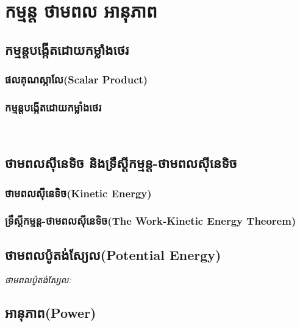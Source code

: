 \chapter{កម្មន្ត ថាមពល អានុភាព}
\section{កម្មន្តបង្កើតដោយកម្លាំងថេរ}
\subsection{ផលគុណស្កាលែ{\en(Scalar Product)}}
\subsection{កម្មន្តបង្កើតដោយកម្លាំងថេរ}​
\section{ថាមពលស៊ីនេទិច និងទ្រឹស្តីកម្មន្ត-ថាមពលស៊ីនេទិច}
\subsection{ថាមពលស៊ីនេទិច{\en(Kinetic Energy)}}
\subsection{ទ្រឹស្តីកម្មន្ត-ថាមពលស៊ីនេទិច{\en(The Work-Kinetic Energy Theorem)}}
\section{ថាមពលប៉ូតង់ស្យែល{\en(Potential Energy)}}
\begin{definition}
	\emph{\kml ថាមពលប៉ូតង់ស្យែលៈ}
\end{definition}
\section{អានុភាព{\en(Power)}}
